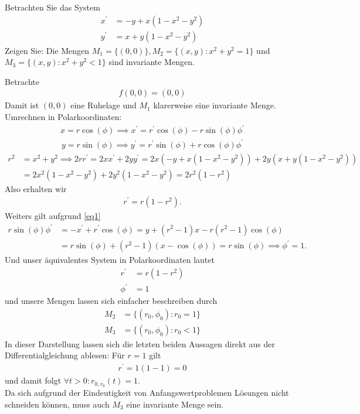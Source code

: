 \begin{exercise}
Betrachten Sie das System
\begin{align*}
  x^{\prime} &= -y + x(1 - x^2 - y^2) \\
  y^{\prime} &= x + y(1 - x^2 - y^2)
\end{align*}
Zeigen Sie: Die Mengen $M_1 = \{(0,0)\}, M_2 = \{(x,y): x^2 + y^2 = 1\}$
und $M_3 = \{(x,y): x^2 + y^2 < 1\}$ sind invariante Mengen.
\end{exercise}
\begin{solution}
Betrachte
\begin{align*}
  f(0,0) = (0,0)
\end{align*}
Damit ist $(0,0)$ eine Ruhelage und $M_1$ klarerweise eine invariante Menge. \\
Umrechnen in Polarkoordinaten:
\begin{align}\label{eq1}
  x = r\cos(\phi) \implies x^{\prime} = r^\prime\cos(\phi)  - r\sin(\phi)\phi^{\prime}
\end{align}
\begin{align*}
  y = r\sin(\phi) \implies y^{\prime} = r^{\prime}\sin(\phi) + r\cos(\phi)\phi^{\prime}
\end{align*}
\begin{align*}
  r^2 &= x^2 + y^2 \implies
  2rr^{\prime} = 2xx^{\prime} + 2yy^{\prime} = 2x(-y + x(1 - x^2 - y^2)) + 2y(x + y(1 - x^2 - y^2)) \\
  &= 2x^2(1 - x^2 - y^2) + 2y^2(1 - x^2 - y^2)
  = 2r^2(1 - r^2)
\end{align*}
Also erhalten wir
\begin{align*}
  r^{\prime} = r(1 - r^2).
\end{align*}
Weiters gilt aufgrund \eqref{eq1}
\begin{align*}
  r \sin(\phi)\phi^{\prime} &= -x^{\prime} + r^{\prime}\cos(\phi) = y + (r^2 - 1)x - r(r^2 - 1)\cos(\phi) \\
  &= r\sin(\phi) + (r^2 - 1)(x-\cos(\phi)) =
  r\sin(\phi) \implies \phi^{\prime} = 1.
\end{align*}
Und unser äquivalentes System in Polarkoordinaten lautet
\begin{align*}
  r^{\prime} &= r(1 - r^2) \\
  \phi^{\prime} &= 1
\end{align*}
und unsere Mengen lassen sich einfacher beschreiben durch
\begin{align*}
  M_2 &= \{(r_0,\phi_0): r_0 = 1\} \\
  M_3 &= \{(r_0,\phi_0): r_0 < 1\}
\end{align*}
In dieser Darstellung lassen sich die letzten beiden Aussagen direkt aus der Differentialgleichung ablesen:
Für $r = 1$ gilt
\begin{align*}
  r^{\prime} = 1(1-1)= 0
\end{align*}
und damit folgt $\forall t > 0: r_{0,r_0}(t) = 1$. \\
Da sich aufgrund der Eindeutigkeit von Anfangswertproblemen Lösungen nicht schneiden
können, muss auch $M_3$ eine invariante Menge sein.
\end{solution}

